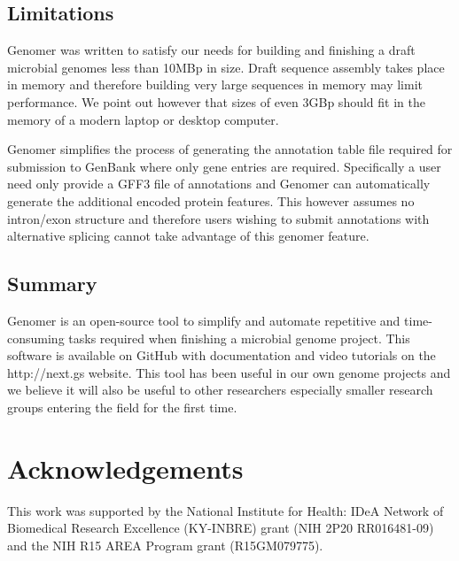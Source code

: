 \documentclass[10pt]{article}
\begin{document}
\subsection*{Limitations}

Genomer was written to satisfy our needs for building and finishing a draft
microbial genomes less than 10MBp in size. Draft sequence assembly takes place
in memory and therefore building very large sequences in memory may limit
performance. We point out however that sizes of even 3GBp should fit in the
memory of a modern laptop or desktop computer.

Genomer simplifies the process of generating the annotation table file required
for submission to GenBank where only gene entries are required. Specifically a
user need only provide a GFF3 file of annotations and Genomer can automatically
generate the additional encoded protein features. This however assumes no
intron/exon structure and therefore users wishing to submit annotations with
alternative splicing cannot take advantage of this genomer feature.

\subsection*{Summary}

Genomer is an open-source tool to simplify and automate repetitive and
time-consuming tasks required when finishing a microbial genome project. This
software is available on GitHub \cite{genomer-github} with documentation and
video tutorials on the http://next.gs website. This tool has been useful in our
own genome projects and we believe it will also be useful to other researchers
especially smaller research groups entering the field for the first time.

\section*{Acknowledgements}

This work was supported by the National Institute for Health: IDeA Network of
Biomedical Research Excellence (KY-INBRE) grant (NIH 2P20 RR016481-09) and the
NIH R15 AREA Program grant (R15GM079775).


\end{document}
